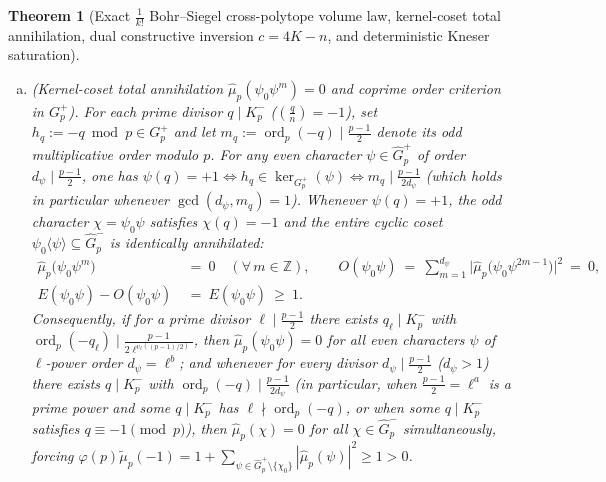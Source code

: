\documentclass[11pt, a4paper]{article}
\theoremstyle{plain}
\newtheorem{theorem}{Theorem}[section]
\theoremstyle{definition}
\newcommand{\Z}{\mathbb{Z}}
\newcommand{\leg}[2]{\left(\frac{#1}{#2}\right)}
\begin{document}
\begin{theorem}[Exact $\frac{1}{k!}$ Bohr--Siegel cross-polytope volume law, kernel-coset total annihilation, dual constructive inversion $c=4K-n$, and deterministic Kneser saturation]
\begin{enumerate}[(a)]
    \item \emph{(Kernel-coset total annihilation $\widehat{\mu}_p(\psi_0\psi^{m})=0$ and coprime order criterion in $G_p^{+}$).} For each prime divisor $q\mid K_p^{-}$ ($\leg{q}{n}=-1$), set $h_q:=-q\bmod p\in G_p^{+}$ and let $m_q:=\operatorname{ord}_p(-q)\mid\frac{p-1}{2}$ denote its odd multiplicative order modulo $p$. For any even character $\psi\in\widehat{G}_p^{+}$ of order $d_{\psi}\mid\frac{p-1}{2}$, one has $\psi(q)=+1\iff h_q\in\ker_{G_p^{+}}(\psi)\iff m_q\mid\frac{p-1}{2d_{\psi}}$ (which holds in particular whenever $\gcd(d_{\psi},m_q)=1$). Whenever $\psi(q)=+1$, the odd character $\chi=\psi_0\psi$ satisfies $\chi(q)=-1$ and \emph{the entire cyclic coset $\psi_0\langle\psi\rangle\subseteq\widehat{G}_p^{-}$ is identically annihilated}:
    \begin{equation}\label{eq:kernel_coset_total_annihilation}
    \begin{split}
    \widehat{\mu}_p\big(\psi_0\psi^{m}\big)\ &=\ 0\quad (\forall\,m\in\Z),\qquad O(\psi_0\psi)\ =\ \sum_{m=1}^{d_{\psi}}\big|\widehat{\mu}_p\big(\psi_0\psi^{2m-1}\big)\big|^{2}\ =\ 0,\\
    E(\psi_0\psi)-O(\psi_0\psi)\ &=\ E(\psi_0\psi)\ \ge\ 1.
    \end{split}
    \end{equation}
    Consequently, if for a prime divisor $\ell\mid\frac{p-1}{2}$ there exists $q_{\ell}\mid K_p^{-}$ with $\operatorname{ord}_p(-q_{\ell})\mid\frac{p-1}{2\ell^{v_{\ell}((p-1)/2)}}$, then $\widehat{\mu}_p(\psi_0\psi)=0$ for all even characters $\psi$ of $\ell$-power order $d_{\psi}=\ell^{b}$; and whenever for every divisor $d_{\psi}\mid\frac{p-1}{2}$ ($d_{\psi}>1$) there exists $q\mid K_p^{-}$ with $\operatorname{ord}_p(-q)\mid\frac{p-1}{2d_{\psi}}$ (in particular, when $\frac{p-1}{2}=\ell^{a}$ is a prime power and some $q\mid K_p^{-}$ has $\ell\nmid\operatorname{ord}_p(-q)$, or when some $q\mid K_p^{-}$ satisfies $q\equiv-1\pmod p$), then $\widehat{\mu}_p(\chi)=0$ for \emph{all} $\chi\in\widehat{G}_p^{-}$ simultaneously, forcing $\varphi(p)\widetilde{\mu}_p(-1)=1+\sum_{\psi\in\widehat{G}_p^{+}\setminus\{\chi_0\}}|\widehat{\mu}_p(\psi)|^{2}\ge 1>0$.


\end{enumerate}
\end{theorem}
\end{document}
